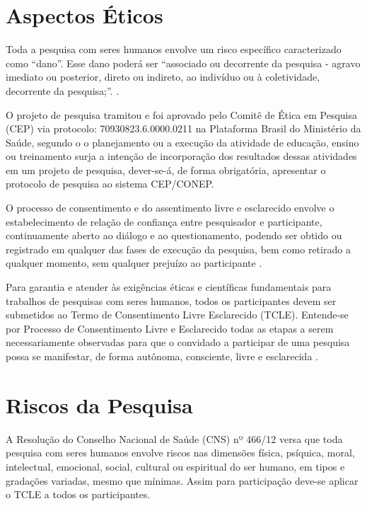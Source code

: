 \section{Aspectos Éticos}
\label{aspectos_eticos}

Toda a pesquisa com seres humanos envolve um risco específico caracterizado como “dano”. Esse dano poderá ser “associado ou decorrente da pesquisa - agravo imediato ou posterior, direto ou indireto, ao indivíduo ou à coletividade, decorrente da pesquisa;”. \cite{cns466}.

O projeto de pesquisa tramitou e foi aprovado pelo Comitê de Ética em Pesquisa (CEP) via protocolo: 70930823.6.0000.0211 na Plataforma Brasil do Ministério da Saúde, segundo o  o planejamento ou a execução da atividade de educação, ensino ou treinamento surja a intenção de incorporação dos resultados dessas atividades em um projeto de pesquisa, dever-se-á, de forma obrigatória, apresentar o protocolo de pesquisa ao sistema CEP/CONEP.

O processo de consentimento e do assentimento livre e esclarecido envolve o estabelecimento de relação de confiança entre pesquisador e participante, continuamente aberto ao diálogo e ao questionamento, podendo ser obtido ou registrado em qualquer das fases de execução da pesquisa, bem como retirado a qualquer momento, sem qualquer prejuízo ao participante \cite{cns510}.

Para garantia e atender às exigências éticas e científicas fundamentais para trabalhos de pesquisas com seres humanos, todos os participantes devem ser submetidos ao Termo de Consentimento Livre Esclarecido (TCLE). Entende-se por Processo de Consentimento Livre e Esclarecido todas as etapas a serem necessariamente observadas para que o convidado a participar de uma pesquisa possa se manifestar, de forma autônoma, consciente, livre e esclarecida \cite{cns466}.




\section{Riscos da Pesquisa}
\label{riscos_pesquisa}

A Resolução do Conselho Nacional de Saúde (CNS) nº 466/12 versa que toda pesquisa com seres humanos envolve riscos nas dimensões física, psíquica, moral, intelectual, emocional, social, cultural ou espiritual do ser humano, em tipos e gradações variadas, mesmo que mínimas. Assim para participação deve-se aplicar o TCLE a todos os participantes.


